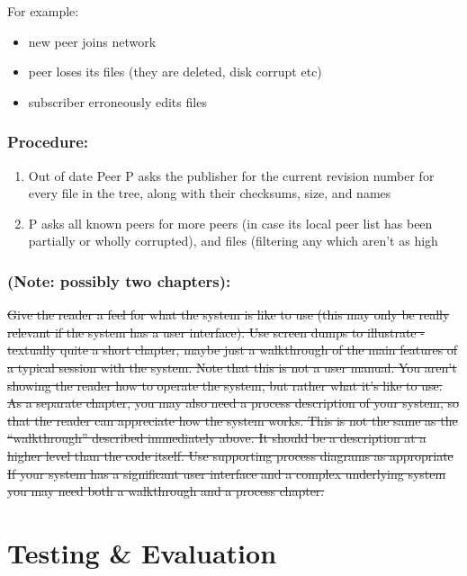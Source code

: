 \documentclass[12pt,a4paper,]{adreport}
\begin{document}
For example:

\begin{itemize}
\itemsep1pt\parskip0pt
\item
  new peer joins network
\item
  peer loses its files (they are deleted, disk corrupt etc)
\item
  subscriber erroneously edits files
\end{itemize}

\subsection{Procedure:}\label{procedure}

\begin{enumerate}
\def\labelenumi{\arabic{enumi}.}
\itemsep1pt\parskip0pt
\item
  Out of date Peer P asks the publisher for the current revision number
  for every file in the tree, along with their checksums, size, and
  names
\item
  P asks all known peers for more peers (in case its local peer list has
  been partially or wholly corrupted), and files (filtering any which
  aren't as high
\end{enumerate}

\subsection{(Note: possibly two
chapters):}\label{note-possibly-two-chapters}

\sout{Give the reader a feel for what the system is like to use (this
may only be really relevant if the system has a user interface). Use
screen dumps to illustrate - textually quite a short chapter, maybe just
a walkthrough of the main features of a typical session with the system.
Note that this is not a user manual. You aren't showing the reader how
to operate the system, but rather what it's like to use. As a separate
chapter, you may also need a process description of your system, so that
the reader can appreciate how the system works. This is not the same as
the ``walkthrough'' described immediately above. It should be a
description at a higher level than the code itself. Use supporting
process diagrams as appropriate If your system has a significant user
interface and a complex underlying system you may need both a
walkthrough and a process chapter.}

\chapter{Testing \& Evaluation}\label{testing-evaluation}
\end{document}

